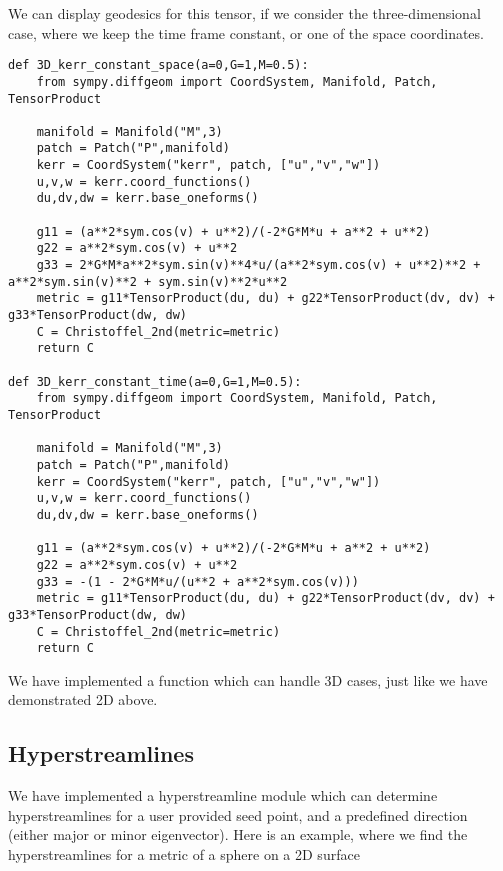 \documentclass[main.tex]{subfiles}
\begin{document}
We can display geodesics for this tensor, if we consider the three-dimensional case, where
we keep the time frame constant, or one of the space coordinates.

\lstset{style=Python}
\begin{lstlisting}
def 3D_kerr_constant_space(a=0,G=1,M=0.5):
    from sympy.diffgeom import CoordSystem, Manifold, Patch, TensorProduct
    
    manifold = Manifold("M",3)
    patch = Patch("P",manifold)
    kerr = CoordSystem("kerr", patch, ["u","v","w"])
    u,v,w = kerr.coord_functions()
    du,dv,dw = kerr.base_oneforms()

    g11 = (a**2*sym.cos(v) + u**2)/(-2*G*M*u + a**2 + u**2)
    g22 = a**2*sym.cos(v) + u**2
    g33 = 2*G*M*a**2*sym.sin(v)**4*u/(a**2*sym.cos(v) + u**2)**2 + a**2*sym.sin(v)**2 + sym.sin(v)**2*u**2
    metric = g11*TensorProduct(du, du) + g22*TensorProduct(dv, dv) + g33*TensorProduct(dw, dw)
    C = Christoffel_2nd(metric=metric)
    return C

def 3D_kerr_constant_time(a=0,G=1,M=0.5):
    from sympy.diffgeom import CoordSystem, Manifold, Patch, TensorProduct
    
    manifold = Manifold("M",3)
    patch = Patch("P",manifold)
    kerr = CoordSystem("kerr", patch, ["u","v","w"])
    u,v,w = kerr.coord_functions()
    du,dv,dw = kerr.base_oneforms()

    g11 = (a**2*sym.cos(v) + u**2)/(-2*G*M*u + a**2 + u**2)
    g22 = a**2*sym.cos(v) + u**2
    g33 = -(1 - 2*G*M*u/(u**2 + a**2*sym.cos(v)))
    metric = g11*TensorProduct(du, du) + g22*TensorProduct(dv, dv) + g33*TensorProduct(dw, dw)
    C = Christoffel_2nd(metric=metric)
    return C
\end{lstlisting}
We have implemented a function which can handle 3D cases, just like we have demonstrated 2D
above.

\subsection{Hyperstreamlines}
We have implemented a hyperstreamline module which can determine hyperstreamlines for
a user provided seed point, and a predefined direction (either major or minor eigenvector). 
Here is an example, where we find the hyperstreamlines for a metric of a sphere on a 2D surface
\end{document}
